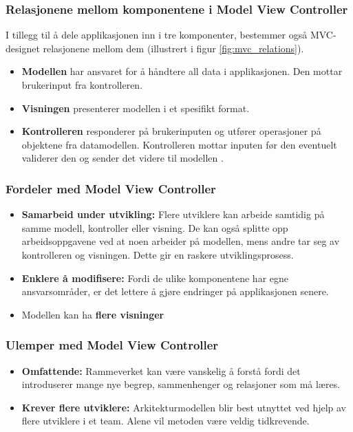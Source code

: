 \subsubsection{Relasjonene mellom komponentene i Model View Controller}
I tillegg til å dele applikasjonen inn i tre komponenter,  bestemmer også MVC-designet relasjonene mellom dem (illustrert i figur \ref{fig:mvc_relations}). 
\begin{itemize}
    \item \textbf{Modellen} har ansvaret for å håndtere all data i applikasjonen. Den mottar brukerinput fra kontrolleren.
    \item \textbf{Visningen} presenterer modellen i et spesifikt format.
    \item \textbf{Kontrolleren} responderer på brukerinputen og utfører operasjoner på objektene fra datamodellen. Kontrolleren mottar inputen før den eventuelt validerer den og sender det videre til modellen \cite{MVC_relations}.
\end{itemize}

\subsubsection{Fordeler med Model View Controller}
\begin{itemize}
    \item \textbf{Samarbeid under utvikling:} Flere utviklere kan arbeide samtidig på samme modell, kontroller eller visning. De kan også splitte opp arbeidsoppgavene ved at noen arbeider på modellen, mens andre tar seg av kontrolleren og visningen. Dette gir en raskere utviklingsprosess.
    \item \textbf{Enklere å modifisere:} Fordi de ulike komponentene har egne ansvarsområder, er det lettere å gjøre endringer på applikasjonen senere.
    \item Modellen kan ha \textbf{flere visninger}
\end{itemize}

\subsubsection{Ulemper med Model View Controller}
\begin{itemize}
    \item \textbf{Omfattende:} Rammeverket kan være vanskelig å forstå fordi det introduserer mange nye begrep, sammenhenger og relasjoner som må læres.
    \item \textbf{Krever flere utviklere:} Arkitekturmodellen blir best utnyttet ved hjelp av flere utviklere i et team. Alene vil metoden være veldig tidkrevende. 
\end{itemize}


